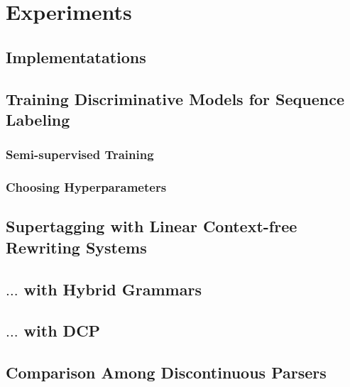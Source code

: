 \documentclass[../document.tex]{subfiles}
\begin{document}
    \chapter{Experiments}
    \section{Implementatations}
    \section{Training Discriminative Models for Sequence Labeling}
    \subsection{Semi-supervised Training}
    \subsection{Choosing Hyperparameters}
    \section{Supertagging with Linear Context-free Rewriting Systems}
    \section{$\ldots$ with Hybrid Grammars}
    \section{$\ldots$ with DCP}
    \section{Comparison Among Discontinuous Parsers}
\end{document}
